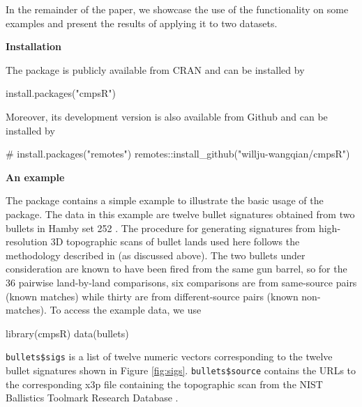 In the remainder of the paper, we showcase the use of the 
functionality on some examples and present the results of applying it to
two datasets.

\textbf{Installation}

The  package is publicly available from CRAN and can be
installed by

\begin{Schunk}
\begin{Sinput}
install.packages("cmpsR")
\end{Sinput}
\end{Schunk}

Moreover, its development version is also available from Github and can
be installed by

\begin{Schunk}
\begin{Sinput}
# install.packages("remotes")
remotes::install_github("willju-wangqian/cmpsR")
\end{Sinput}
\end{Schunk}

\textbf{An example}

The  package contains a simple example to illustrate the
basic usage of the package. The data in this example are twelve bullet
signatures obtained from two bullets in Hamby set 252 \citep{hamby}. The
procedure for generating signatures from high-resolution 3D topographic
scans of bullet lands used here follows the methodology described in
\citet{aoas} (as discussed above). The two bullets under consideration
are known to have been fired from the same gun barrel, so for the 36
pairwise land-by-land comparisons, six comparisons are from same-source
pairs (known matches) while thirty are from different-source pairs
(known non-matches). To access the example data, we use

\begin{Schunk}
\begin{Sinput}
library(cmpsR)
data(bullets)
\end{Sinput}
\end{Schunk}

\texttt{bullets\$sigs} is a list of twelve numeric vectors corresponding
to the twelve bullet signatures shown in Figure \ref{fig:sigs}.
\texttt{bullets\$source} contains the URLs to the corresponding x3p file
containing the topographic scan from the NIST Ballistics Toolmark
Research Database \citep{nistdb}.

